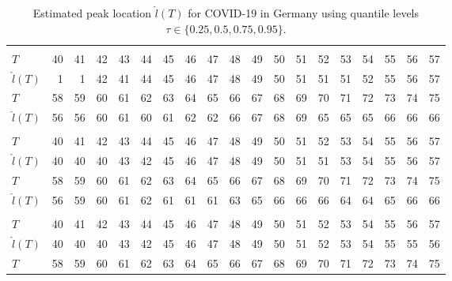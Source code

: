 \documentclass[12pt,a4paper]{article}
\begin{document}
{		\begin{landscape}
			\begin{table}[htbp]
				\caption{Estimated peak location $\hat{l}(T)$ for COVID-19 in Germany using quantile levels $\tau\in\{0.25,0.5,0.75,0.95\}$.}
				\label{tab:germany_tau}
				\begin{tabular*}{\linewidth}{@{\extracolsep{\fill}}lrrrrrrrrrrrrrrrrrr}
					\toprule
					\addlinespace[2.5pt]
					\multicolumn{19}{c}{\textbf{$\tau=0.25,\ T_{\mathrm{entry}}=55,\ \varepsilon=15$}} \\
					\addlinespace[2.5pt]
					\midrule
					$T$ & 40 & 41 & 42 & 43 & 44 & 45 & 46 & 47 & 48 & 49 & 50 & 51 & 52 & 53 & 54 & 55 & 56 & 57 \\
					$\hat{l}(T)$ & 1 & 1 & 42 & 41 & 44 & 45 & 46 & 47 & 48 & 49 & 50 & 51 & 51 & 51 & 52 & 55 & 56 & 57 \\
					$T$ & 58 & 59 & 60 & 61 & 62 & 63 & 64 & 65 & 66 & 67 & 68 & 69 & 70 & 71 & 72 & 73 & 74 & 75 \\
					$\hat{l}(T)$ & 56 & 56 & 60 & 61 & 60 & 61 & 62 & 62 & 66 & 67 & 68 & 69 & 65 & 65 & 65 & 66 & 66 & 66 \\
					\midrule\addlinespace[2.5pt]
					\multicolumn{19}{c}{\textbf{$\tau=0.5,\ T_{\mathrm{entry}}=51,\ \varepsilon=15$}} \\
					\addlinespace[2.5pt]
					\midrule
					$T$ & 40 & 41 & 42 & 43 & 44 & 45 & 46 & 47 & 48 & 49 & 50 & 51 & 52 & 53 & 54 & 55 & 56 & 57 \\
					$\hat{l}(T)$ & 40 & 40 & 40 & 43 & 42 & 45 & 46 & 47 & 48 & 49 & 50 & 51 & 51 & 53 & 54 & 55 & 56 & 57 \\
					$T$ & 58 & 59 & 60 & 61 & 62 & 63 & 64 & 65 & 66 & 67 & 68 & 69 & 70 & 71 & 72 & 73 & 74 & 75 \\
					$\hat{l}(T)$ & 56 & 59 & 60 & 61 & 62 & 61 & 61 & 61 & 63 & 65 & 66 & 66 & 66 & 64 & 64 & 65 & 66 & 66 \\
					\midrule\addlinespace[2.5pt]
					\multicolumn{19}{c}{\textbf{$\tau=0.75,\ T_{\mathrm{entry}}=51,\ \varepsilon=15$}} \\
					\addlinespace[2.5pt]
					\midrule
					$T$ & 40 & 41 & 42 & 43 & 44 & 45 & 46 & 47 & 48 & 49 & 50 & 51 & 52 & 53 & 54 & 55 & 56 & 57 \\
					$\hat{l}(T)$ & 40 & 40 & 40 & 43 & 42 & 45 & 46 & 47 & 48 & 49 & 50 & 51 & 52 & 53 & 54 & 55 & 55 & 56 \\
					$T$ & 58 & 59 & 60 & 61 & 62 & 63 & 64 & 65 & 66 & 67 & 68 & 69 & 70 & 71 & 72 & 73 & 74 & 75 \\

\end{tabular*}
\end{table}
\end{landscape}}
\end{document}
